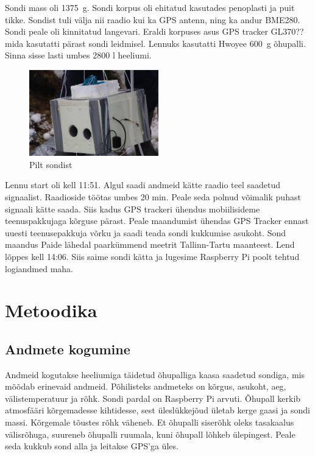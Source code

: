 \documentclass{trkut}%
\begin{document}
Sondi mass oli \SI{1375}{g}. Sondi korpus oli ehitatud kasutades penoplasti ja puit tikke. Sondist tuli välja nii raadio kui ka GPS antenn, ning ka andur BME280. Sondi peale oli kinnitatud langevari. Eraldi korpuses asus GPS tracker GL370?? mida kasutatti pärast sondi leidmisel. Lennuks kasutatti Hwoyee \SI{600}{g} õhupalli. Sinna sisse lasti umbes 2800 l heeliumi.

\begin{figure}[h]
	\includegraphics[width=0.5\textwidth]{PicGra/sond.jpg}
	\caption{Pilt sondist}
	\label{sond}%
\end{figure}

Lennu start oli kell 11:51. Algul saadi andmeid kätte raadio teel saadetud signaalist. Raadioside töötas umbes 20 min. Peale seda polnud võimalik puhast signaali kätte saada. Siis kadus GPS trackeri ühendus mobiilisideme teenuspakkujaga kõrguse pärast. Peale maandumist ühendas GPS Tracker ennast uuesti teenusepakkuja võrku ja saadi teada sondi kukkumise asukoht. Sond maandus Paide lähedal paarkümmend meetrit Tallinn-Tartu maanteest. Lend lõppes kell 14:06. Siis saime sondi kätta ja lugesime Raspberry Pi poolt tehtud logiandmed maha.

\section{Metoodika}
\subsection{Andmete kogumine}
Andmeid kogutakse heeliumiga täidetud õhupalliga kaasa saadetud sondiga, mis mõõdab erinevaid andmeid. Põhilisteks andmeteks on kõrgus, asukoht, aeg, välistemperatuur ja rõhk. Sondi pardal on Raspberry Pi arvuti. Õhupall kerkib atmosfääri kõrgemadesse kihtidesse, sest üleslükkejõud ületab kerge gaasi ja sondi massi. Kõrgemale tõustes rõhk väheneb. Et õhupalli siserõhk oleks tasakaalus välisrõhuga, suureneb õhupalli ruumala, kuni õhupall lõhkeb ülepingest. Peale seda kukkub sond alla ja leitakse GPS'ga üles.
\end{document}

